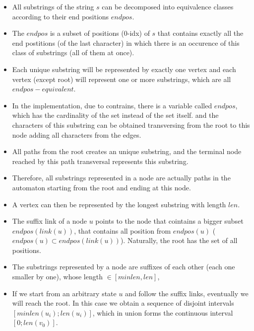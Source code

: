     \begin{itemize}

        \item All substrings of the string $s$ can be decomposed into equivalence classes according to their end positions $endpos$.

        \item The $endpos$ is a subset of positions (0-idx) of $s$ that contains exactly all the end postitions (of the last character)
        in which there is an occurence of this class of substrings (all of them at once).

        \item Each unique substring will be represented by exactly one vertex and each vertex (except root) 
        will represent one or more substrings, which are all $endpos-equivalent$.

        \item In the implementation, due to contrains, there is a variable called $endpos$, which has the cardinality of the set instead of the set itself.
        and the characters of this substring can be obtained transversing from the root to this node adding all characters from the edges.

        \item All paths from the root creates an unique substring, and the terminal node reached by this path transversal represents this substring.

        \item Therefore, all substrings represented in a node are actually paths in the automaton starting from the root and ending at this node.

        \item A vertex can then be represented by the longest substring with length $len$.

        \item The suffix link of a node $u$ points to the node that cointains a bigger subset $endpos(link(u))$,
        that contains all position from $endpos(u)$ ($endpos(u) \subset endpos(link(u))$). Naturally, the root has the set of all positions.

        \item The substrings represented by a node are suffixes of each other (each one smaller by one), whose length $\in [minlen, len]$,

        \item If we start from an arbitrary state $u$ and follow the suffix links, eventually we will reach the root.
        In this case we obtain a sequence of disjoint intervals $[minlen(u_i); len(u_i)]$, 
        which in union forms the continuous interval $[0; len(v_0)]$.


\end{itemize}
